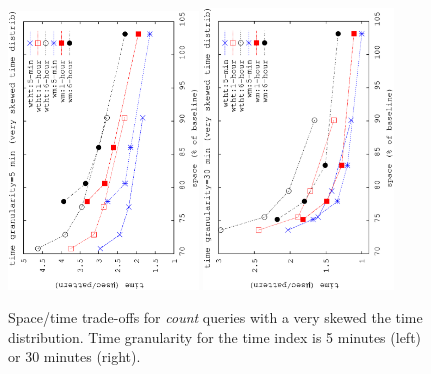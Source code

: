 	\begin{figure}[ht]
		\begin{center}
			\includegraphics[angle=-90,width=0.45\textwidth]{figures_synt/veryskewed5m.eps}
			\includegraphics[angle=-90,width=0.45\textwidth]{figures_synt/veryskewed30m.eps}
			\caption{Space/time trade-offs for {\em count} queries with a very skewed the time distribution.
				Time granularity for the time index is 5 minutes (left) or 30 minutes (right).
			}
			\label{fig:ctr:exp:queries:wt:veryskewed}
		\end{center}
	\end{figure}

